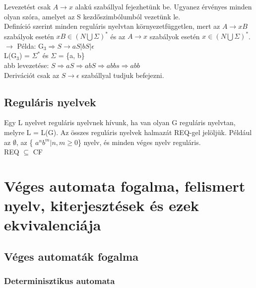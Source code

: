 \documentclass{article}
\begin{document}
    Levezetést csak $ A \rightarrow x $ alakú szabállyal fejezhetünk be. Ugyanez érvényes minden olyan szóra, amelyet az S kezdőszimbólumból vezetünk le. \\ \newline
    \indent Definíció szerint minden reguláris nyelvtan környezetfüggetlen, mert az $ A \rightarrow xB $ szabályok esetén $ xB \in (N \bigcup \Sigma)^* $ és az $ A \rightarrow x $ szabályok esetén $ x \in (N \bigcup \Sigma)^* $.
    \newline \newline
    $ \rightarrow $ Példa: G$_3 \Rightarrow S \rightarrow aS | bS | \epsilon $ \\ \newline
    \indent \indent L(G$_3$) = $ \Sigma ^* $ és $ \Sigma $ = \{a, b\} \\
    \indent \indent abb levezetése: $ S \Rightarrow aS \Rightarrow abS \Rightarrow abbs \Rightarrow abb $ \\
    \indent \indent Derivációt csak az $ S \rightarrow \epsilon $ szabállyal tudjuk befejezni.

    \subsection{Reguláris nyelvek}

    Egy L nyelvet reguláris nyelvnek hívunk, ha van olyan G reguláris nyelvtan, melyre L = L(G). Az összes reguláris nyelvek halmazát REQ-gel jelöljük. Például az $ \emptyset $, az \{ $a^n b^m | n, m \ge 0 $\} nyelv, és minden véges nyelv reguláris. \\
    REQ $ \subseteq $ CF

    \newpage
    \section{Véges automata fogalma, felismert nyelv, kiterjesztések és ezek ekvivalenciája}

    \subsection{Véges automaták fogalma}

    \subsubsection{Determinisztikus automata}
\end{document}
